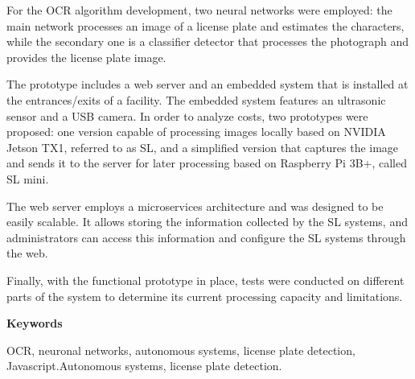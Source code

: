 For the OCR algorithm development, two neural networks were employed: the main network processes an image of a license plate and estimates the characters, while the secondary one is a classifier detector that processes the photograph and provides the license plate image.

The prototype includes a web server and an embedded system that is installed at the entrances/exits of a facility. The embedded system features an ultrasonic sensor and a USB camera. In order to analyze costs, two prototypes were proposed: one version capable of processing images locally based on NVIDIA Jetson TX1, referred to as SL, and a simplified version that captures the image and sends it to the server for later processing based on Raspberry Pi 3B+, called SL mini.

The web server employs a microservices architecture and was designed to be easily scalable. It allows storing the information collected by the SL systems, and administrators can access this information and configure the SL systems through the web.

Finally, with the functional prototype in place, tests were conducted on different parts of the system to determine its current processing capacity and limitations.

\vspace*{\fill}
\noindent \textbf{Keywords}

OCR, neuronal networks, autonomous systems, license plate detection, Javascript.Autonomous systems, license plate detection.
